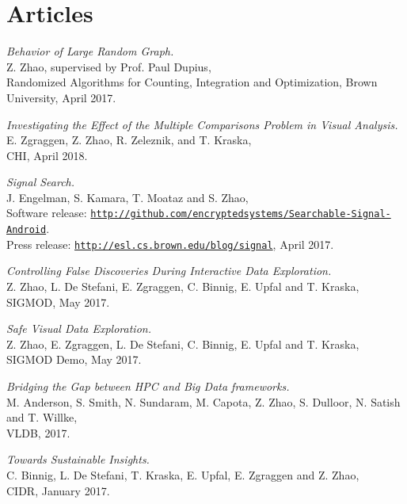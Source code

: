 \documentclass[letterpaper]{article}
\renewenvironment{itemize}{
  \begin{list}{}{
    \setlength{\leftmargin}{1.5em}
  }
}{
  \end{list}
}
\begin{document}
\section*{Articles}

\begin{itemize}

\item \textit{Behavior of Large Random Graph.}\\
  Z. Zhao, supervised by Prof. Paul Dupius, \\
  Randomized Algorithms for Counting, Integration and Optimization, Brown University, April 2017.

\item \textit{Investigating the Effect of the Multiple Comparisons Problem in Visual Analysis.} \\
  E. Zgraggen, Z. Zhao, R. Zeleznik, and T. Kraska, \\
  CHI, April 2018.

\item \textit{Signal Search.} \\
  J. Engelman, S. Kamara, T. Moataz and S. Zhao, \\
  Software release: \href{http://github.com/encryptedsystems/Searchable-Signal-Android}{\tt http://github.com/encryptedsystems/Searchable-Signal-Android}. \\
  Press release: \href{http://esl.cs.brown.edu/blog/signal}{\tt http://esl.cs.brown.edu/blog/signal}, April 2017.

\item \textit{Controlling False Discoveries During Interactive Data Exploration.} \\
  Z. Zhao, L. De Stefani, E. Zgraggen, C. Binnig, E. Upfal and T. Kraska, \\
  SIGMOD, May 2017.

\item \textit{Safe Visual Data Exploration.} \\
  Z. Zhao, E. Zgraggen, L. De Stefani, C. Binnig, E. Upfal and T. Kraska, \\
  SIGMOD Demo, May 2017.

\item \textit{Bridging the Gap between HPC and Big Data frameworks.} \\
  M. Anderson, S. Smith, N. Sundaram, M. Capota, Z. Zhao, S. Dulloor, N. Satish and T. Willke, \\
  VLDB, 2017.

\item \textit{Towards Sustainable Insights.} \\
  C. Binnig, L. De Stefani, T. Kraska, E. Upfal, E. Zgraggen and Z. Zhao, \\
  CIDR, January 2017.


\end{itemize}
\end{document}
